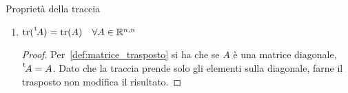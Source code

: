 \begin{SubDef}{Proprietà della traccia}
\begin{enumerate}
\begin{proof}
\begin{equation*}
          d_{ii} = \sum^{n}_{k=1} b_{ik}a_{ki}
        \end{equation*}
        Per la~\autoref{def:matrice_traccia}
        \begin{equation}\label{eq:matrice_traccia_3_dim_2}
          \tr(BA) = \sum^{n}_{i=1} d_{ii} = \sum^{n}_{i=1} \sum^{n}_{k=1} b_{ik}a_{ki} =
          \sum^{n}_{i,k=1} b_{ik}a_{ki}
        \end{equation}
        Dato che in $\mathbb{R}$ il prodotto è commutativo e che sia $i$ che $k$, sia in
        \eqref{eq:matrice_traccia_3_dim_1} e \eqref{eq:matrice_traccia_3_dim_2} variano
        da $1$ a $n$, si può affermare che
        \begin{equation*}
          \sum^{n}_{i,k=1} a_{ik}b_{ki} = \sum^{n}_{i,k} b_{ik}a_{ki}
        \end{equation*}
      \end{proof}
    \item $\tr(\mskip1mu\prescript{\smash{\mathrm t\mkern-3mu} }{}{\mathstrut A}) = \tr(A)\quad\forall A\in\mathbb{R}^{n,n}$
      \begin{proof}
        Per~\autoref{def:matrice_trasposto} si ha che se $A$ è una matrice diagonale,
        $\mskip1mu\prescript{\smash{\mathrm t\mkern-3mu} }{}{\mathstrut A} = A$. Dato che la traccia prende solo gli elementi sulla diagonale,
        farne il trasposto non modifica il risultato.
      \end{proof}
  \end{enumerate}
\end{SubDef}
